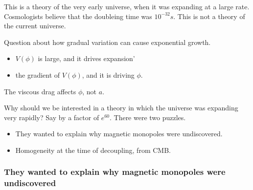 \documentclass[]{article}
\begin{document}
This is a theory of the very early universe, when it was expanding at a large rate.
Cosmologists believe that the doubleing time was $10^{-32}s$. This is not a theory of the current universe.

Question about how gradual variation can cause exponential growth.
\begin{itemize}
	\item $V(\phi)$ is large, and it drives expansion'
	\item the gradient of $V(\phi)$, and it is driving $\phi$.
\end{itemize}
The viscous drag affects $\phi$, not $a$.

Why should we be interested in a theory in which the universe was expanding very rapidly? Say by a factor of $e^{60}$. There were two puzzles.
\begin{itemize}
	\item They wanted to explain why magnetic monopoles were undiscovered. 
	\item Homogeneity at the time of decoupling, from CMB.
\end{itemize}

\subsubsection{They wanted to explain why magnetic monopoles were undiscovered}
\end{document}
